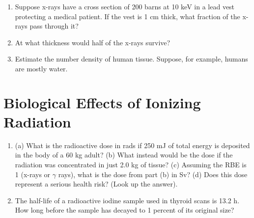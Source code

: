 \documentclass{article}
\begin{document}
\begin{enumerate}
\item Suppose x-rays have a cross section of 200 barns at 10 keV in a lead vest protecting a medical patient.  If the vest is 1 cm thick, what fraction of the x-rays pass through it? \\ \vspace{3cm}
\item At what thickness would half of the x-rays survive? \\ \vspace{3cm}
\item Estimate the number density of human tissue.  Suppose, for example, humans are mostly water. \\ \vspace{2cm}
\end{enumerate}

\section{Biological Effects of Ionizing \\ Radiation}

\begin{enumerate}
\item (a) What is the radioactive dose in rads if 250 mJ of total energy is deposited in the body of a 60 kg adult? (b) What instead would be the dose if the radiation was concentrated in just 2.0 kg of tissue? (c) Assuming the RBE is 1 (x-rays or $\gamma$ rays), what is the dose from part (b) in Sv? (d) Does this dose represent a serious health risk? (Look up the answer). \\ \vspace{5cm}
\item The half-life of a radioactive iodine sample used in thyroid scans is 13.2 h.  How long before the sample has decayed to 1 percent of its original size?
\end{enumerate}
\end{document}
